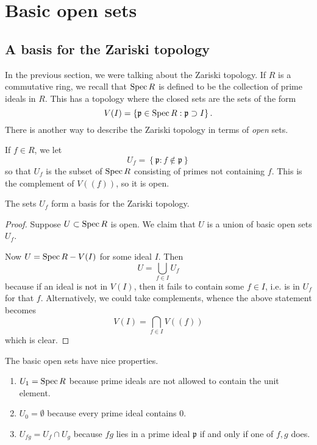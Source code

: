 \section{Basic open sets}

\subsection{A basis for the Zariski topology}
In the previous section, we were talking about the Zariski topology. If $R$ is a
commutative ring, we recall that $\operatorname{Spec} R$ is defined to be the collection of
prime ideals in $R$. This has a topology where the closed sets are the sets of
the form
\[ V(I) = \left\{\mathfrak{p} \in \operatorname{Spec} R: \mathfrak{p} \supset I\right\} . \]
There is another way to describe the Zariski topology in terms of
\emph{open} sets.  

\begin{definition} 
If $f \in R$, we let 
\[ U_f = \left\{\mathfrak{p}: f \notin \mathfrak{p}\right\}  \]
so that $U_f$ is the subset of $\operatorname{Spec} R$ consisting of primes not containing
$f$. This is the complement of $V((f))$, so it is open.  
\end{definition} 

\begin{proposition} 
The sets $U_f$ form a basis for the Zariski topology. 
\end{proposition} 

\begin{proof} 
Suppose $U \subset \operatorname{Spec} R$ is open.  We claim that $U$ is a union of basic
open sets $U_f$. 

Now $U = \operatorname{Spec} R - V(I)$ for some ideal $I$.  Then
\[ U = \bigcup_{f \in I} U_f  \]
because if an ideal is not in $V(I)$, then it fails to contain some $f \in I$,
i.e. is in $U_f$ for that $f$. Alternatively, we could take complements, whence
the above statement becomes
\[ V(I) = \bigcap_{f \in I} V((f))  \]
which is clear.
\end{proof} 

The basic open sets have nice properties.
\begin{enumerate}
\item $U_1  = \operatorname{Spec} R$ because prime ideals are not allowed to contain the
unit element. 
\item $U_0 = \emptyset$ because every prime ideal contains $0$.
\item $U_{fg} = U_f \cap U_g$ because $fg$ lies in a prime ideal $\mathfrak{p}$ if and only if one of $f,g$ does.
\end{enumerate}

